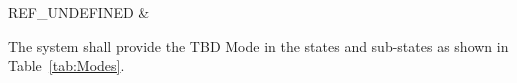 REF\_UNDEFINED & \begin{minipage}{\KppRightColumnWidth}{\vspace{\KppVspace}The system shall provide the TBD Mode in the states and sub-states as shown in Table~\ref{tab:Modes}.\vspace{\KppVspace}}\end{minipage}\\ \hline%

